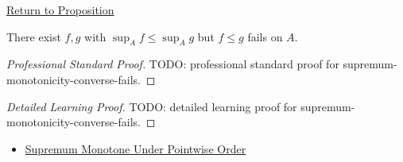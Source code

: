 \newpage
{}
\label{prf:supremum-monotonicity-converse-fails}

\begin{remark*}[Return]
\hyperref[prop:supremum-monotonicity-converse-fails]{Return to Proposition}
\end{remark*}

\begin{proposition*}
There exist \(f,g\) with \(\sup_A f\leq\sup_A g\) but \(f\leq g\) fails on \(A\).
\end{proposition*}

\begin{proof}[Professional Standard Proof]
\LRAProofBodyStart
TODO: professional standard proof for supremum-monotonicity-converse-fails.
\end{proof}

\begin{proof}[Detailed Learning Proof]
\LRAProofBodyStart
TODO: detailed learning proof for supremum-monotonicity-converse-fails.
\end{proof}

\begin{remark*}
\end{remark*}

\begin{dependencies}
\begin{itemize}
  \item \hyperref[thm:supremum-monotone-under-pointwise-order]{Supremum Monotone Under Pointwise Order}
\end{itemize}
\end{dependencies}

\clearpage
